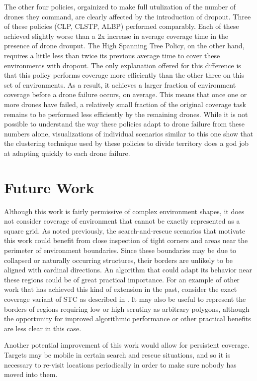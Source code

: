 The other four policies, orgainized to make full utulization of the number of drones they command, are clearly affected by the introduction of dropout. Three of these policies (CLP, CLSTP, ALBP) performed comparably. Each of these achieved slightly worse than a 2x increase in average coverage time in the presence of drone drouput. The High Spanning Tree Policy, on the other hand, requires a little less than twice its previous average time to cover these environments with dropout. The only explanation offered for this difference is that this policy performs coverage more efficiently than the other three on this set of environments. As a result, it achieves a larger fraction of environment coverage before a drone failure occurs, on average. This means that once one or more drones have failed, a relatively small fraction of the original coverage task remains to be performed less efficiently by the remaining drones. While it is not possible to understand the way these policies adapt to drone failure from these numbers alone, visualizations of individual scenarios similar to this one show that the clustering technique used by these policies to divide territory does a god job at adapting quickly to each drone failure.

\section{Future Work}

Although this work is fairly permissive of complex environment shapes, it does not consider coverage of environment that cannot be exactly represented as a square grid. As noted previously, the search-and-rescue scenarios that motivate this work could benefit from close inspection of tight corners and areas near the perimeter of environment boundaries. Since these boundaries may be due to collapsed or naturally occurring structures, their borders are unlikely to be aligned with cardinal directions. An algorithm that could adapt its behavior near these regions could be of great practical importance. For an example of other work that has achieved this kind of extension in the past, consider the exact coverage variant of STC as described in \cite{STC}. It may also be useful to represent the borders of regions requiring low or high scrutiny as arbitrary polygons, although the opportunity for improved algorithmic performance or other practical benefits are less clear in this case.

Another potential improvement of this work would allow for persistent coverage. Targets may be mobile in certain search and rescue situations, and so it is necessary to re-visit locations periodically in order to make sure nobody has moved into them. %

